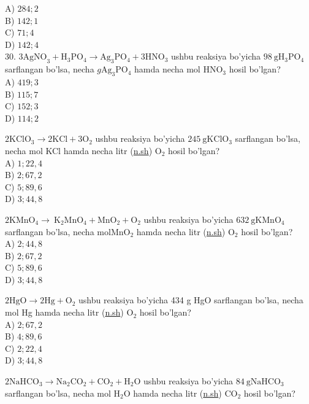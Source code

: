 A) $284 ; 2$\\
B) $142 ; 1$\\
C) $71 ; 4$\\
D) $142 ; 4$\\
30. $3 \mathrm{AgNO}_{3}+\mathrm{H}_{3} \mathrm{PO}_{4} \rightarrow \mathrm{Ag}_{3} \mathrm{PO}_{4}+3 \mathrm{HNO}_{3}$ ushbu reaksiya bo'yicha $98 \mathrm{~g} \mathrm{H}_{3} \mathrm{PO}_{4}$ sarflangan bo'lsa, necha $g \mathrm{Ag}_{3} \mathrm{PO}_{4}$ hamda necha mol $\mathrm{HNO}_{3}$ hosil bo'lgan?\\
A) $419 ; 3$\\
B) $115 ; 7$\\
C) $152 ; 3$\\
D) $114 ; 2$
  \item $2 \mathrm{KClO}_{3} \longrightarrow 2 \mathrm{KCl}+3 \mathrm{O}_{2}$ ushbu reaksiya bo'yicha $245 \mathrm{~g} \mathrm{KClO}_{3}$ sarflangan bo'lsa, necha mol KCl hamda necha litr (\href{http://n.sh}{n.sh}) $\mathrm{O}_{2}$ hosil bo'lgan?\\
A) $1 ; 22,4$\\
B) $2 ; 67,2$\\
C) $5 ; 89,6$\\
D) $3 ; 44,8$
  \item $2 \mathrm{KMnO}_{4} \rightarrow \mathrm{~K}_{2} \mathrm{MnO}_{4}+\mathrm{MnO}_{2}+\mathrm{O}_{2}$ ushbu reaksiya bo'yicha $632 \mathrm{~g} \mathrm{KMnO}_{4}$ sarflangan bo'lsa, necha $\mathrm{mol} \mathrm{MnO}_{2}$ hamda necha litr (\href{http://n.sh}{n.sh}) $\mathrm{O}_{2}$ hosil bo'lgan?\\
A) $2 ; 44,8$\\
B) $2 ; 67,2$\\
C) $5 ; 89,6$\\
D) $3 ; 44,8$
  \item $2 \mathrm{HgO} \rightarrow 2 \mathrm{Hg}+\mathrm{O}_{2}$ ushbu reaksiya bo'yicha 434 g HgO sarflangan bo'lsa, necha mol Hg hamda necha litr (\href{http://n.sh}{n.sh}) $\mathrm{O}_{2}$ hosil bo'lgan?\\
A) $2 ; 67,2$\\
B) $4 ; 89,6$\\
C) $2 ; 22,4$\\
D) $3 ; 44,8$
  \item $2 \mathrm{NaHCO}_{3} \rightarrow \mathrm{Na}_{2} \mathrm{CO}_{2}+\mathrm{CO}_{2}+\mathrm{H}_{2} \mathrm{O}$ ushbu reaksiya bo'yicha $84 \mathrm{~g} \mathrm{NaHCO}_{3}$ sarflangan bo'lsa, necha mol $\mathrm{H}_{2} \mathrm{O}$ hamda necha litr (\href{http://n.sh}{n.sh}) $\mathrm{CO}_{2}$ hosil bo'lgan?\\
